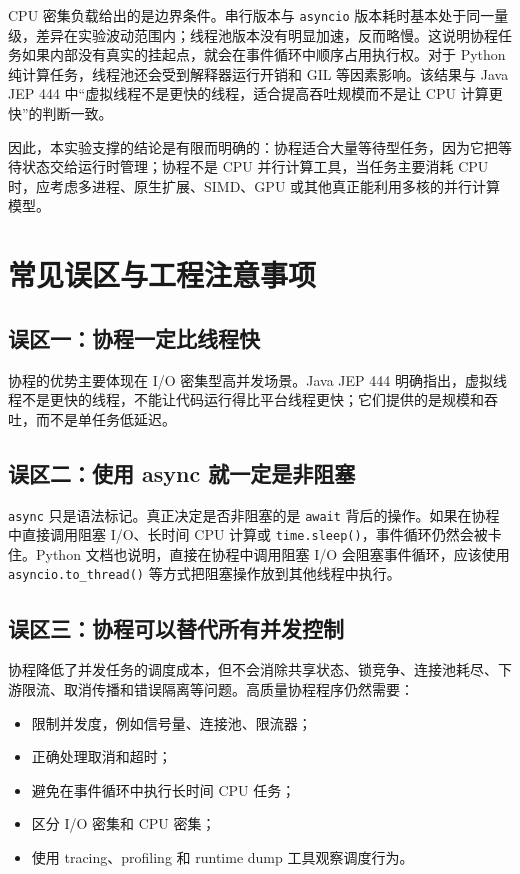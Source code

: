 \documentclass[UTF8,zihao=-4]{ctexart}
\begin{document}
CPU 密集负载给出的是边界条件。串行版本与 \texttt{asyncio} 版本耗时基本处于同一量级，差异在实验波动范围内；线程池版本没有明显加速，反而略慢。这说明协程任务如果内部没有真实的挂起点，就会在事件循环中顺序占用执行权。对于 Python 纯计算任务，线程池还会受到解释器运行开销和 GIL 等因素影响。该结果与 Java JEP 444 中“虚拟线程不是更快的线程，适合提高吞吐规模而不是让 CPU 计算更快”的判断一致\cite{jep444-notfaster}。

因此，本实验支撑的结论是有限而明确的：协程适合大量等待型任务，因为它把等待状态交给运行时管理；协程不是 CPU 并行计算工具，当任务主要消耗 CPU 时，应考虑多进程、原生扩展、SIMD、GPU 或其他真正能利用多核的并行计算模型。

\section{常见误区与工程注意事项}

\subsection{误区一：协程一定比线程快}

协程的优势主要体现在 I/O 密集型高并发场景。Java JEP 444 明确指出，虚拟线程不是更快的线程，不能让代码运行得比平台线程更快；它们提供的是规模和吞吐，而不是单任务低延迟\cite{jep444-notfaster}。

\subsection{误区二：使用 async 就一定是非阻塞}

\texttt{async} 只是语法标记。真正决定是否非阻塞的是 \texttt{await} 背后的操作。如果在协程中直接调用阻塞 I/O、长时间 CPU 计算或 \texttt{time.sleep()}，事件循环仍然会被卡住。Python 文档也说明，直接在协程中调用阻塞 I/O 会阻塞事件循环，应该使用 \texttt{asyncio.to\_thread()} 等方式把阻塞操作放到其他线程中执行\cite{asyncio-task}。

\subsection{误区三：协程可以替代所有并发控制}

协程降低了并发任务的调度成本，但不会消除共享状态、锁竞争、连接池耗尽、下游限流、取消传播和错误隔离等问题。高质量协程程序仍然需要：

\begin{itemize}
  \item 限制并发度，例如信号量、连接池、限流器；
  \item 正确处理取消和超时；
  \item 避免在事件循环中执行长时间 CPU 任务；
  \item 区分 I/O 密集和 CPU 密集；
  \item 使用 tracing、profiling 和 runtime dump 工具观察调度行为。
\end{itemize}
\end{document}
